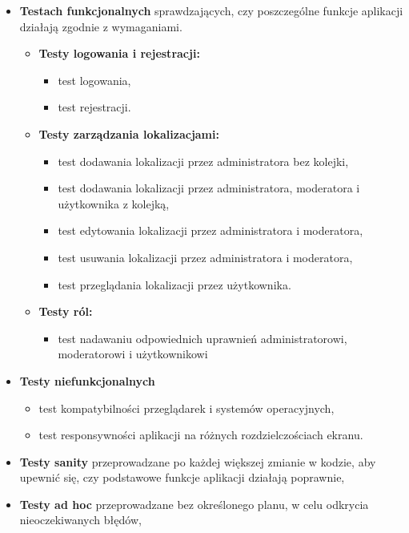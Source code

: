 \begin{itemize}
		\item \textbf{Testach funkcjonalnych} sprawdzających, czy poszczególne funkcje aplikacji działają zgodnie z wymaganiami.
		\begin{itemize}
			\item \textbf{Testy logowania i rejestracji:}
			\begin{itemize}
					\item test logowania,
					\item test rejestracji.
			\end{itemize}
			\item \textbf{Testy zarządzania lokalizacjami:}
			\begin{itemize}
					\item test dodawania lokalizacji przez administratora bez kolejki,
					\item test dodawania lokalizacji przez administratora, moderatora i użytkownika z kolejką,
					\item test edytowania lokalizacji przez administratora i moderatora,
					\item test usuwania lokalizacji przez administratora i moderatora,
					\item test przeglądania lokalizacji przez użytkownika.
			\end{itemize}
			\item \textbf{Testy ról:}
			\begin{itemize}
				\item test nadawaniu odpowiednich uprawnień administratorowi, moderatorowi i użytkownikowi
			\end{itemize} 
		\end{itemize} 
		
		\item \textbf{Testy niefunkcjonalnych}
		\begin{itemize}
			\item test kompatybilności przeglądarek i systemów operacyjnych,
			\item test responsywności aplikacji na różnych rozdzielczościach ekranu.
		\end{itemize} 

		\item \textbf{Testy sanity} przeprowadzane po każdej większej zmianie w kodzie, aby upewnić się, czy podstawowe funkcje aplikacji działają poprawnie,

		\item \textbf{Testy ad hoc} przeprowadzane bez określonego planu, w celu odkrycia nieoczekiwanych błędów,


\end{itemize}
